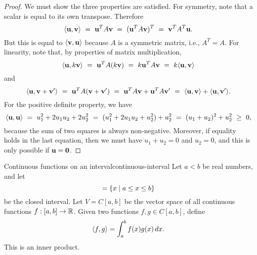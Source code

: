 \begin{proof}
  We must show the three properties are satisfied. For symmetry, note
  that a scalar is equal to its own transpose. Therefore
  \begin{equation*}
    \iprod{\vect{u},\vect{v}}
    ~=~ \vect{u}^T A \vect{v}
    ~=~ (\vect{u}^T A \vect{v})^T
    ~=~ \vect{v}^T A^T \vect{u}.
  \end{equation*}
  But this is equal to $\iprod{\vect{v},\vect{u}}$ because $A$ is a
  symmetric matrix, i.e., $A^T=A$.
  For linearity, note that, by properties of matrix multiplication,
  \begin{equation*}
    \iprod{\vect{u},k\vect{v}}
    ~=~ \vect{u}^T A(k\vect{v})
    ~=~ k\vect{u}^T A\vect{v}
    ~=~ k\iprod{\vect{u},\vect{v}}
  \end{equation*}
  and
  \begin{equation*}
    \iprod{\vect{u},\vect{v}+\vect{v}'}
    ~=~ \vect{u}^T A(\vect{v}+\vect{v}')
    ~=~ \vect{u}^T A\vect{v}+\vect{u}^T A\vect{v}'
    ~=~ \iprod{\vect{u},\vect{v}} +
    \iprod{\vect{u},\vect{v}'}.
  \end{equation*}
  For the positive definite property, we have
  \begin{equation*}
    \iprod{\vect{u},\vect{u}}
    ~=~ u_1^2 + 2u_1u_2 + 2u_2^2
    ~=~ (u_1^2 + 2u_1u_2 + u_2^2) + u_2^2
    ~=~ (u_1+u_2)^2 + u_2^2
    ~\geq~ 0,
  \end{equation*}
  because the sum of two squares is always non-negative. Moreover, if
  equality holds in the last equation, then we must have $u_1+u_2=0$
  and $u_2=0$, and this is only possible if $\vect{u}=\vect{0}$.
\end{proof}

\begin{example}{Continuous functions on an interval}{continuous-interval}
  Let $a<b$ be real numbers, and let
  \begin{equation*}
    [a,b] = \set{x \mid a \leq x \leq b}
  \end{equation*}
  be the closed interval. Let $V=C[a,b]$%
   be the vector space of all continuous
  functions%
  $f:[a,b]\to\mathbb{R}$. Given two functions $f,g\in C[a,b]$, define
  \begin{equation*}
    \langle f,g\rangle = \int_a^b f(x)g(x)\,dx.
  \end{equation*}
  This is an inner product.
\end{example}

